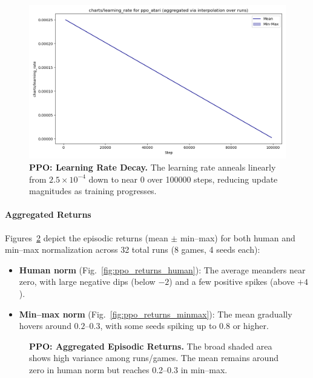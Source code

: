 \begin{figure} 
	\centering
	\includegraphics[width=.5\textwidth]{figures/ppo/charts_learning_rate_ppo_atari.png}
	\caption{\textbf{PPO: Learning Rate Decay.}
		The learning rate anneals linearly from $2.5\times10^{-4}$ down to near $0$ 
		over \num{100000} steps, reducing update magnitudes as training progresses.}
	\label{fig:ppo_lr}
\end{figure}

\paragraph{Aggregated Returns}
Figures~\ref{fig:ppo_returns_agg} depict the episodic returns (mean $\pm$ min--max) 
for both human and min--max normalization across 32 total runs (8 games, 4 seeds each):
\begin{itemize}
	\item \textbf{Human norm} 
	(Fig.~\ref{fig:ppo_returns_human}): The average meanders near zero, with large 
	negative dips (below $-2$) and a few positive spikes (above $+4$).
	\item \textbf{Min--max norm}
	(Fig.~\ref{fig:ppo_returns_minmax}): The mean gradually hovers around $0.2$--$0.3$, 
	with some seeds spiking up to $0.8$ or higher.
\end{itemize}

\begin{figure}
	\centering
	\quad
	\caption{\textbf{PPO: Aggregated Episodic Returns.} 
		The broad shaded area shows high variance among runs/games. 
		The mean remains around zero in human norm but reaches 0.2--0.3 in min--max.}
	\label{fig:ppo_returns_agg}
\end{figure}

